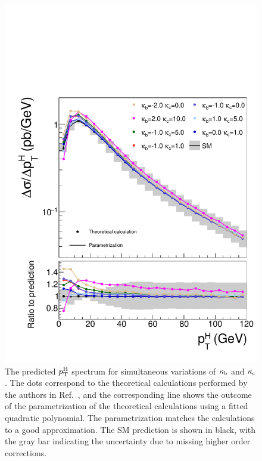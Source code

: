 \begin{figure}[hbtp]
  \begin{center}
    \includegraphics[width=\halflinewidth]{img/interpretation/other/varparcomp_kbkc.pdf}
    \caption{
        The predicted $p_\mathrm{T}^\mathrm{H}$ spectrum for simultaneous variations of $\kappa_{\mathrm{b}}$ and $\kappa_{\mathrm{c}}$.
        The dots correspond to the theoretical calculations performed by the authors in Ref.~\cite{Bishara:2016jga}, and the corresponding line shows the outcome of the parametrization of the theoretical calculations using a fitted quadratic polynomial.
        The parametrization matches the calculations to a good approximation.
        The SM prediction is shown in black, with the gray bar indicating the uncertainty due to missing higher order corrections.
        }
    \label{fig:theories_kbkc}
  \end{center}
\end{figure}


